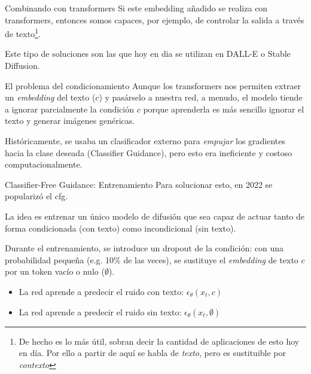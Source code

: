 \begin{frame}{Combinando con transformers}
Si este embedding añadido se realiza con \alert{transformers}, entonces somos capaces, por ejemplo, de controlar la salida a través de texto\footnote{De hecho es lo más útil, sobran decir la cantidad de aplicaciones de esto hoy en día. Por ello a partir de aquí se habla de \textit{texto}, pero es sustituible por \textit{contexto}}.

Este tipo de soluciones son las que hoy en dia se utilizan en \alert{DALL-E} o \alert{Stable Diffusion}.
\end{frame}

\begin{frame}{El problema del condicionamiento}
Aunque los \alert{transformers} nos permiten extraer un \textit{embedding} del texto ($c$) y pasárselo a nuestra red, a menudo, el modelo tiende a \alert{ignorar parcialmente} la condición $c$ porque aprenderla es más sencillo ignorar el texto y generar imágenes genéricas.

Históricamente, se usaba un clasificador externo para \textit{empujar} los gradientes hacia la clase deseada (\alert{Classifier Guidance}\cite{dhariwal2021diffusion}), pero esto era ineficiente y costoso computacionalmente.
\end{frame}

\begin{frame}{Classifier-Free Guidance: Entrenamiento}
Para solucionar esto, en 2022 se popularizó el \alert{\gls{cfg}}\cite{ho2022classifier}. 

La idea es entrenar \alert{un único modelo de difusión} que sea capaz de actuar tanto de forma condicionada (con texto) como incondicional (sin texto).

Durante el entrenamiento, se introduce un \alert{dropout de la condición}: con una probabilidad pequeña (e.g. 10\% de las veces), se sustituye el \textit{embedding} de texto $c$ por un token vacío o nulo ($\emptyset$).

\begin{itemize}
    \item La red aprende a predecir el ruido con texto: $\epsilon_\theta(x_t, c)$
    \item La red aprende a predecir el ruido sin texto: $\epsilon_\theta(x_t, \emptyset)$
\end{itemize}
\end{frame}

